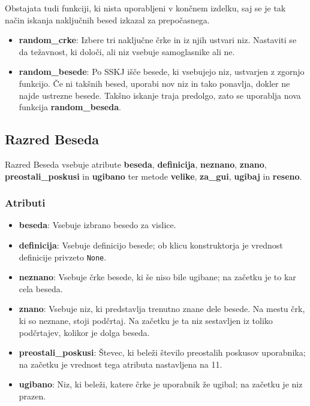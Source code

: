 \documentclass [a4paper, 12pt] {article}
\begin{document}
Obstajata tudi funkciji, ki nista uporabljeni v končnem izdelku, saj se je tak način iskanja naključnih besed izkazal za prepočasnega.
\begin {itemize}
\item \textbf {random\_crke}: Izbere tri naključne črke in iz njih ustvari niz. Nastaviti se da težavnost, ki določi, ali niz vsebuje samoglasnike ali ne.
\item \textbf {random\_besede}: Po SSKJ išče besede, ki vsebujejo niz, ustvarjen z zgornjo funkcijo. Če ni takšnih besed, uporabi nov niz in tako ponavlja, dokler ne najde ustrezne besede. Takšno iskanje traja predolgo, zato se uporablja nova funkcija \textbf {random\_beseda}.
\end {itemize}

\subsection {Razred Beseda}
Razred Beseda vsebuje atribute \textbf {beseda}, \textbf {definicija}, \textbf {neznano}, \textbf {znano}, \textbf {preostali\_poskusi} in \textbf {ugibano} ter metode \textbf {velike}, \textbf {za\_gui}, \textbf {ugibaj} in \textbf {reseno}.
\subsubsection {Atributi}
\begin {itemize}
\item \textbf {beseda}: Vsebuje izbrano besedo za vislice.
\item \textbf {definicija}: Vsebuje definicijo besede; ob klicu konstruktorja je vrednost definicije privzeto \texttt {None}.
\item \textbf {neznano}: Vsebuje črke besede, ki še niso bile ugibane; na začetku je to kar cela beseda. 
\item \textbf {znano}: Vsebuje niz, ki predstavlja trenutno znane dele besede. Na mestu črk, ki so neznane, stoji podčrtaj. Na začetku je ta niz sestavljen iz toliko podčrtajev, kolikor je dolga beseda.
\item \textbf {preostali\_poskusi}: Števec, ki beleži število preostalih poskusov uporabnika; na začetku je vrednost tega atributa nastavljena na 11. 
\item \textbf {ugibano}: Niz, ki beleži, katere črke je uporabnik že ugibal; na začetku je niz prazen.
\end {itemize}
\end{document}

